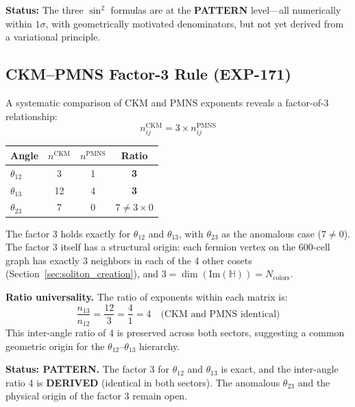 \documentclass[12pt,a4paper]{article}
\begin{document}
\textbf{Status:} The three $\sin^2$ formulas are at the \textbf{PATTERN} level---all numerically within $1\sigma$, with geometrically motivated denominators, but not yet derived from a variational principle.

\subsection{CKM--PMNS Factor-3 Rule (EXP-171)}

A systematic comparison of CKM and PMNS exponents reveals a factor-of-3 relationship:
\begin{equation}
n^{\text{CKM}}_{ij} = 3 \times n^{\text{PMNS}}_{ij}
\end{equation}

\begin{center}
\begin{tabular}{lccc}
\toprule
\textbf{Angle} & $n^{\text{CKM}}$ & $n^{\text{PMNS}}$ & \textbf{Ratio} \\
\midrule
$\theta_{12}$ & 3 & 1 & \textbf{3} \\
$\theta_{13}$ & 12 & 4 & \textbf{3} \\
$\theta_{23}$ & 7 & 0 & $7 \neq 3 \times 0$ \\
\bottomrule
\end{tabular}
\end{center}

The factor 3 holds exactly for $\theta_{12}$ and $\theta_{13}$, with $\theta_{23}$ as the anomalous case ($7 \neq 0$). The factor 3 itself has a structural origin: each fermion vertex on the 600-cell graph has exactly 3 neighbors in each of the 4 other cosets (Section~\ref{sec:soliton_creation}), and $3 = \dim(\text{Im}(\mathbb{H})) = N_{\text{colors}}$.

\textbf{Ratio universality.} The ratio of exponents within each matrix is:
\begin{equation}
\frac{n_{13}}{n_{12}} = \frac{12}{3} = \frac{4}{1} = 4 \quad \text{(CKM and PMNS identical)}
\end{equation}
This inter-angle ratio of 4 is preserved across both sectors, suggesting a common geometric origin for the $\theta_{12}$--$\theta_{13}$ hierarchy.

\textbf{Status: PATTERN.} The factor 3 for $\theta_{12}$ and $\theta_{13}$ is exact, and the inter-angle ratio 4 is \textbf{DERIVED} (identical in both sectors). The anomalous $\theta_{23}$ and the physical origin of the factor 3 remain open.
\end{document}
